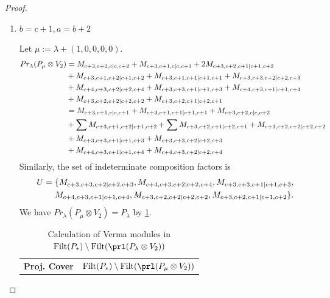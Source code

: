 \begin{proof}
\begin{enumerate}
\begin{enumerate}
      \item $b=c+1,a=b+2$ \par
        Let $\mu:=\lambda + (1,0,0,0,0) $.
        \begin{equation}\notag
          \begin{aligned}
            Pr_{\lambda}(P_\mu \otimes V_{2}) &=
M_{c+3,c+2,c|c,c+2}
+ M_{c+3,c+1,c|c,c+1}
+ 2M_{c+3,c+2,c+1|c+1,c+2}\\
                                              &
+ M_{c+3,c+1,c+2|c+1,c+2}
+ M_{c+3,c+1,c+1|c+1,c+1}
+ M_{c+3,c+3,c+2|c+2,c+3}\\
                                              &
+ M_{c+4,c+3,c+2|c+2,c+4}
+ M_{c+3,c+3,c+1|c+1,c+3}
+ M_{c+4,c+3,c+1|c+1,c+4}\\
                                              &
+ M_{c+3,c+2,c+2|c+2,c+2}
+ M_{c+3,c+2,c+1|c+2,c+1} \\
                                               &=
 M_{c+3,c+1,c|c,c+1}
+  M_{c+3,c+1,c+1|c+1,c+1}
+  M_{c+3,c+2,c|c,c+2}\\
                                              &
+ \sum M_{c+3,c+1,c+2|c+1,c+2}
+ \sum M_{c+3,c+2,c+1|c+2,c+1}
+  M_{c+3,c+2,c+2|c+2,c+2}\\
                                              &
+  M_{c+3,c+3,c+1|c+1,c+3}
+  M_{c+3,c+3,c+2|c+2,c+3}\\
                                              &
+  M_{c+4,c+3,c+1|c+1,c+4}
+  M_{c+4,c+3,c+2|c+2,c+4}
          \end{aligned}
        \end{equation}
      Similarly, the set of indeterminate composition factors is 
\begin{equation}\notag
  \begin{aligned}
    U = \{
M_{c+3,c+3,c+2|c+2,c+3},
M_{c+4,c+3,c+2|c+2,c+4},
M_{c+3,c+3,c+1|c+1,c+3},\\
M_{c+4,c+3,c+1|c+1,c+4},
M_{c+3,c+2,c+2|c+2,c+2},
M_{c+3,c+2,c+1|c+1,c+2}
\}.
  \end{aligned}
\end{equation}
       We have $Pr_{\lambda}(P_\mu \otimes V_{2}) = P_\lambda  $ by \cref{tab:verma-analysis_b_3}.
\begin{table}[htbp]
\centering
\caption{Calculation of Verma modules in $\operatorname{Filt}(P_*) \setminus \operatorname{Filt}(\prl(P_\lambda \otimes V_{2})) $ } \label{tab:verma-analysis_b_3}
\begin{tabular}{cc}
\toprule
\textbf{Proj. Cover} & \textbf{$\operatorname{Filt}(P_*) \setminus \operatorname{Filt}(\prl(P_\mu \otimes V_{2})) $}  \\

\end{tabular}
\end{table}
\end{enumerate}
\end{enumerate}
\end{proof}
